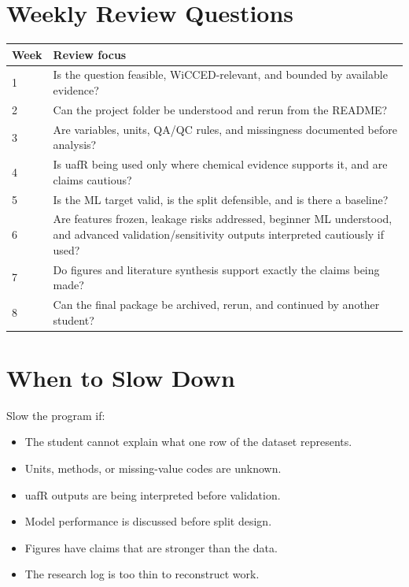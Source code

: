 \section{Weekly Review Questions}

\begin{longtable}{p{}p{}}
\toprule
\textbf{Week} & \textbf{Review focus} \\
\midrule
1 & Is the question feasible, WiCCED-relevant, and bounded by available evidence? \\
2 & Can the project folder be understood and rerun from the README? \\
3 & Are variables, units, QA/QC rules, and missingness documented before analysis? \\
4 & Is uafR being used only where chemical evidence supports it, and are claims cautious? \\
5 & Is the ML target valid, is the split defensible, and is there a baseline? \\
6 & Are features frozen, leakage risks addressed, beginner ML understood, and advanced validation/sensitivity outputs interpreted cautiously if used? \\
7 & Do figures and literature synthesis support exactly the claims being made? \\
8 & Can the final package be archived, rerun, and continued by another student? \\
\bottomrule
\end{longtable}

\section{When to Slow Down}

Slow the program if:
\begin{itemize}
  \item The student cannot explain what one row of the dataset represents.
  \item Units, methods, or missing-value codes are unknown.
  \item uafR outputs are being interpreted before validation.
  \item Model performance is discussed before split design.
  \item Figures have claims that are stronger than the data.
  \item The research log is too thin to reconstruct work.
\end{itemize}

